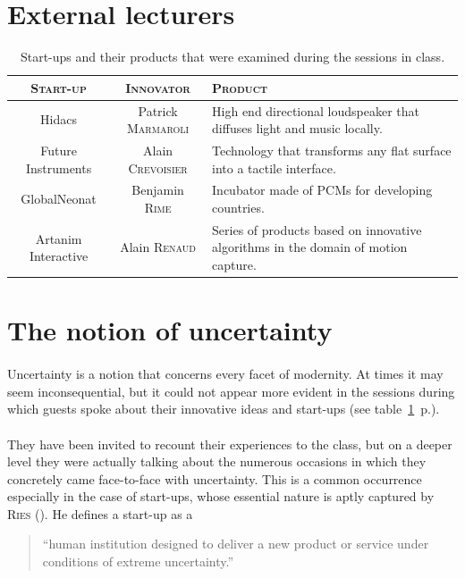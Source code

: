 \documentclass[twoside]{report}
\begin{document}
\section{External lecturers}
\begin{table}[h]
	\begin{tabular}{|ccp{5cm}|}
		\hline
		\textsc{Start-up} & \textsc{Innovator} & \textsc{Product} \\ \hline
		Hidacs & Patrick \textsc{Marmaroli} & High end directional loudspeaker that diffuses light and music locally. \\
		Future Instruments & Alain \textsc{Crevoisier} & Technology that transforms any flat surface into a tactile interface. \\
		GlobalNeonat & Benjamin \textsc{Rime} & Incubator made of PCMs  for developing countries.\\
		Artanim Interactive & Alain \textsc{Renaud} & Series of products based on innovative algorithms in the domain of motion capture. \\
		\hline
	\end{tabular}
	\caption{Start-ups and their products that were examined during the sessions in class.}
	\label{tab:lecturers}
\end{table}
\section{The notion of uncertainty}
\paragraph{}
Uncertainty is a notion that concerns every facet of modernity. At times it may seem inconsequential, but it could not appear more evident in the sessions during which guests spoke about their innovative ideas and start-ups (see table~\ref{tab:lecturers}~p.\pageref{tab:lecturers}). 
\paragraph{}
They have been invited to recount their experiences to the class, but on a deeper level they were actually talking about the numerous occasions in which they concretely came face-to-face with uncertainty. This is a common occurrence especially in the case of start-ups, whose essential nature is aptly captured by \textsc{Ries} (\cite{ries_what_2010}). He defines a start-up as a \begin{quote}\enquote{human institution designed to deliver a new product or service under conditions of extreme uncertainty.}\end{quote}
\end{document}
